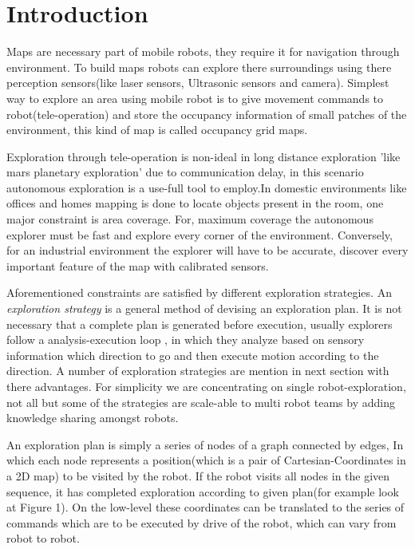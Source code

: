 \section{Introduction}
\label{sec:intro}
Maps are necessary part of mobile robots, they require it for navigation through environment. To
build maps robots can explore there surroundings using there perception sensors(like laser sensors,
Ultrasonic sensors and camera). Simplest way to explore an area using mobile robot is to give
movement commands to robot(tele-operation) and store the occupancy information of small patches of
the environment, this kind of map is called occupancy grid maps. \par

Exploration through tele-operation is non-ideal in long distance exploration 'like mars planetary
exploration' due to communication delay, in this scenario autonomous exploration is a use-full tool
to employ.In domestic environments like offices and homes mapping is done to locate objects present
in the room, one major constraint is area coverage. For, maximum coverage the autonomous explorer
must be fast and explore every corner of the environment. Conversely, for an industrial environment
the explorer will have to be accurate, discover every important feature of the map with calibrated
sensors. \par

Aforementioned constraints are satisfied by different exploration strategies. An \textit{exploration
strategy} is a general method of devising an exploration plan. It is not necessary that a complete
plan is generated before execution, usually explorers follow a analysis-execution loop , in which
they analyze based on sensory information which direction to go and then execute motion according to
the direction. A number of exploration strategies are mention in next section with there advantages.
For simplicity we are concentrating on single robot-exploration, not all but some of the strategies
are scale-able to multi robot teams by adding knowledge sharing amongst robots. \par

An exploration plan is simply a series of nodes of a graph connected by edges, In which each node
represents a position(which is a pair of Cartesian-Coordinates in a 2D map) to be visited by the
robot. If the robot visits all nodes in the given sequence, it has completed exploration according
to given plan(for example look at Figure 1). On the low-level these coordinates can be translated to
the series of commands which are to be executed by drive of the robot, which can vary from robot to
robot. \par


